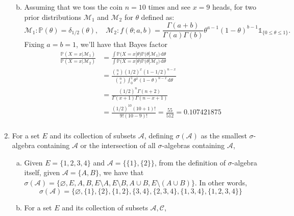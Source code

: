 \documentclass[a4paper,10pt]{article}
\begin{document}
\begin{enumerate}
\begin{enumerate}[(a)]
\begin{equation*}
	\end{equation*}
	\item Assuming that we toss the coin $n=10$ times and see $x=9$ heads, for two prior distributions $\mathcal{M}_1$ and $\mathcal{M}_2$ for $\theta$ defined as:
	\begin{equation*}
		\mathcal{M}_1 : \mathbb{P}(\theta) = \delta_{1/2}(\theta), \quad \mathcal{M}_2 : f(\theta;a,b) = \frac{\Gamma(a+b)}{\Gamma(a)\Gamma(b)} \theta^{a-1} (1-\theta)^{b-1} \mathds{1}_{\{0 \leq \theta \leq 1\}}.
	\end{equation*}
	Fixing $a=b=1$, we'll have that Bayes factor
	\begin{equation*}
		\begin{aligned}
			\frac{\mathbb{P}(X=x|\mathcal{M}_1)}{\mathbb{P}(X=x|\mathcal{M}_2)} &= \frac{\int {\mathbb{P}(X=x|\theta) \mathbb{P}(\theta|\mathcal{M}_1})\,\mathrm{d}\theta}{\int {\mathbb{P}(X=x|\theta) \mathbb{P}(\theta|\mathcal{M}_2})\,\mathrm{d}\theta} \\
			&= \frac{\binom{n}{x}(1/2)^x (1-1/2)^{n-x}}{\binom{n}{x} \int_{0}^{1} \theta^x (1-\theta)^{n-x}\,\mathrm{d}\theta} \\
			&= \frac{(1/2)^n \Gamma(n+2)}{\Gamma(x+1)\Gamma(n-x+1)} \\
			&= \frac{(1/2)^{10} (10+1)!}{9!(10-9)!} = \frac{55}{512} = 0.107421875 \\
		\end{aligned}
	\end{equation*}
\end{enumerate}
\pagebreak
\item For a set $E$ and its collection of subsets $\mathcal{A}$, defining $\sigma(\mathcal{A})$ as the smallest $\sigma$-algebra containing $\mathcal{A}$ or the intersection of all $\sigma$-algebras containing $\mathcal{A}$,
\begin{enumerate}[(a)]
	\item Given $E = \{1,2,3,4\}$ and $\mathcal{A}=\{\{1\},\{2\}\}$, from the definition of $\sigma$-algebra itself, given $\mathcal{A} = \{A, B\}$, we have that $\sigma(\mathcal{A}) = \{\varnothing, E, A, B, E\setminus A, E\setminus B, A \cup B, E\setminus (A \cup B)\}$. In other words, 
	\begin{equation*}
		\sigma(\mathcal{A}) = \{\varnothing, \{1\}, \{2\}, \{1,2\}, \{3,4\}, \{2,3,4\}, \{1,3,4\}, \{1,2,3,4\}\} 
	\end{equation*}
	\item For a set $E$ and its collection of subsets $\mathcal{A},\mathcal{C}$,

\end{enumerate}
\end{enumerate}
\end{document}
